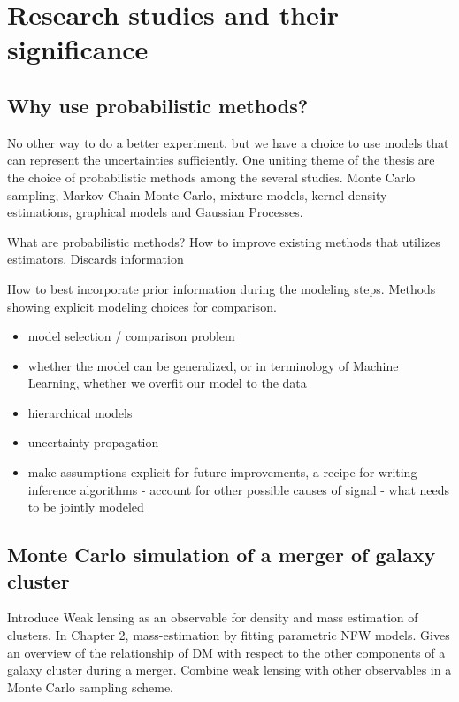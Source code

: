 \documentclass[ucdthesis.tex]{subfiles}
\begin{document}
		\section{Research studies and their significance}
		\subsection{Why use probabilistic methods?}
		No other way to do a better experiment, but we have a choice to use models
		that can represent the uncertainties sufficiently.
		One uniting theme of the thesis are the choice of probabilistic methods
		among the several studies. Monte Carlo sampling, Markov Chain Monte Carlo, 
		mixture models, kernel density estimations, graphical models and 
		Gaussian Processes. 

		What are probabilistic methods?
		How to improve existing methods that utilizes estimators. 
		Discards information 

		How to best incorporate prior information during the modeling steps. 
		Methods showing explicit modeling choices for comparison. 
		
		\begin{itemize}
		\item model selection / comparison problem
		\item whether the model can be generalized, or in terminology of Machine
			Learning, whether we overfit our model to the data 
		\item hierarchical models 
		\item uncertainty propagation 
		\item make assumptions explicit for future improvements, a recipe for writing
		inference algorithms - account for other possible causes of signal 
		- what needs to be jointly modeled 
		\end{itemize}

		\subsection{Monte Carlo simulation of a merger of galaxy cluster}
		Introduce Weak lensing as an observable for density and mass estimation of
		clusters. In Chapter 2, mass-estimation by fitting parametric NFW models. 
		Gives an overview of the relationship of DM with respect to the other
		components of a galaxy cluster during a merger. Combine weak lensing with
		other observables in a Monte Carlo sampling scheme.
\end{document}
